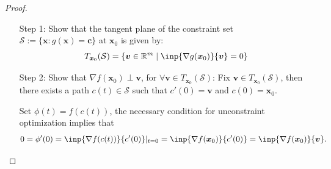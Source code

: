 \begin{proof}\qquad\\
\begin{enumerate}
\item[Step 1: ]
Show that the tangent plane of the constraint set $\mathcal{S}:=\{\bm x:g(\bm x)=\bm c\}$ at $\bm x_0$ is given by:
\begin{equation}
T_{\bm x_0}(\mathcal{S})=\{\bm v\in\mathbb{R}^m\mid\inp{\nabla g(\bm x_0)}{\bm v}=0\}
\end{equation}
\item[Step 2:]
Show that $\nabla f(\bm x_0)\perp\bm v$, for $\forall\bm v\in T_{\bm x_0}(\mathcal{S})$: Fix $\bm v\in T_{\bm x_0}(\mathcal{S})$, then there exists a path $c(t)\in\mathcal{S}$ such that $c'(0)=\bm v$ and $c(0)=\bm x_0$.

Set $\phi(t)=f(c(t))$, the necessary condition for unconstraint optimization implies that
\[
0=\phi'(0)=\inp{\nabla f(c(t))}{c'(0)}|_{t=0}=\inp{\nabla f(\bm x_0)}{c'(0)}=\inp{\nabla f(\bm x_0)}{\bm v}.
\]
\end{enumerate}
\end{proof}

